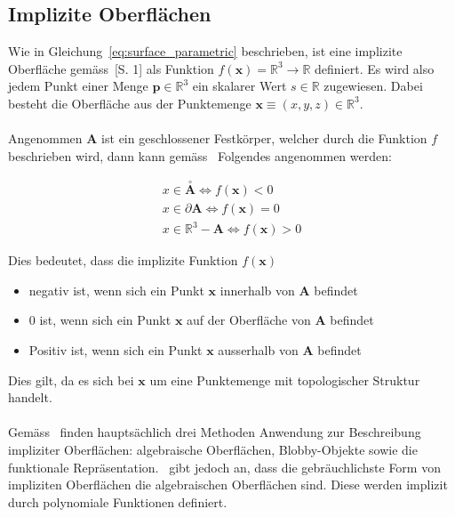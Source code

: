 
\subsection{Implizite Oberflächen}
\label{subsec:implicit_surfaces}

Wie in Gleichung~\ref{eq:surface_parametric} beschrieben, ist eine implizite
Oberfläche gemäss~\cite{hart_ray_1993}[S. 1] als Funktion $ f(\bm{x}) =
\mathbb{R}^{3} \to \mathbb{R} $ definiert.  Es wird also jedem Punkt einer
Menge $ \bm{p} \in \mathbb{R}^{3} $ ein skalarer Wert $ s \in \mathbb{R} $
zugewiesen. Dabei besteht die Oberfläche aus der Punktemenge $ \bm{x} \equiv
(x, y, z) \in \mathbb{R}^{3} $.\\
\\
Angenommen $ \bm{A} $ ist ein geschlossener Festkörper, welcher durch die
Funktion $f$ beschrieben wird, dann kann gemäss~\cite{hart_ray_1993} Folgendes
angenommen werden:

\begin{gather} \label{eq:surface_implicit_condition}
    x \in \overset{\circ}{\bm{A}} \Leftrightarrow f(\bm{x}) < 0 \\
    x \in \partial \bm{A}         \Leftrightarrow f(\bm{x}) = 0 \\
    x \in \mathbb{R}^{3} - \bm{A} \Leftrightarrow f(\bm{x}) > 0
\end{gather}

Dies bedeutet, dass die implizite Funktion $ f(\bm{x}) $
\begin{itemize}
    \item negativ ist, wenn sich ein Punkt $\bm{x}$ innerhalb von $\bm{A}$
        befindet
    \item 0 ist, wenn sich ein Punkt $\bm{x}$ auf der Oberfläche von $\bm{A}$
        befindet
    \item Positiv ist, wenn sich ein Punkt $\bm{x}$ ausserhalb von $\bm{A}$
        befindet
\end{itemize}

Dies gilt, da es sich bei $ \bm{x} $ um eine Punktemenge mit topologischer
Struktur handelt.\\
\\
Gemäss~\cite{division_introduction_1996} finden hauptsächlich drei Methoden
Anwendung zur Beschreibung impliziter Oberflächen: algebraische Oberflächen,
Blobby-Objekte sowie die funktionale Repräsentation.~\cite{hart_sphere_1994}
gibt jedoch an, dass die gebräuchlichste Form von impliziten Oberflächen die
algebraischen Oberflächen sind. Diese werden implizit durch polynomiale
Funktionen definiert.\\


